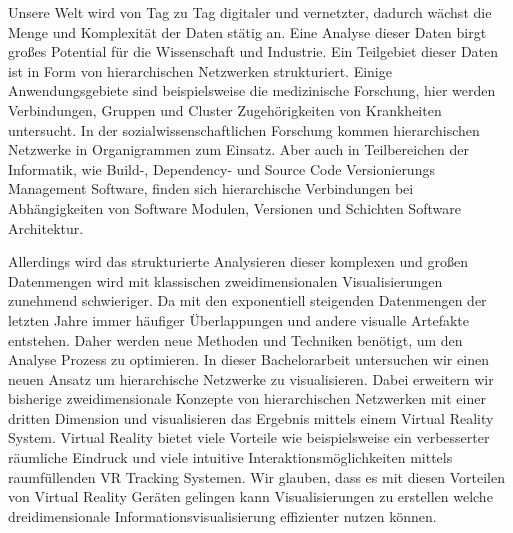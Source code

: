 Unsere Welt wird von Tag zu Tag digitaler und vernetzter, dadurch wächst die Menge und Komplexität der Daten stätig an.
Eine Analyse dieser Daten birgt großes Potential für die Wissenschaft und Industrie.
Ein Teilgebiet dieser Daten ist in Form von hierarchischen Netzwerken strukturiert. Einige Anwendungsgebiete sind beispielsweise die medizinische Forschung, hier werden Verbindungen, Gruppen und Cluster Zugehörigkeiten von Krankheiten untersucht. In der sozialwissenschaftlichen Forschung kommen hierarchischen Netzwerke in Organigrammen zum Einsatz. Aber auch in Teilbereichen der Informatik, wie Build-, Dependency- und Source Code Versionierungs Management Software, finden sich hierarchische Verbindungen bei Abhängigkeiten von Software Modulen, Versionen und Schichten Software Architektur. 

Allerdings wird das strukturierte Analysieren dieser komplexen und großen Datenmengen wird mit klassischen zweidimensionalen Visualisierungen zunehmend schwieriger.
Da mit den exponentiell steigenden Datenmengen der letzten Jahre immer häufiger Überlappungen und andere visualle Artefakte entstehen. 
Daher werden neue Methoden und Techniken benötigt, um den Analyse Prozess zu optimieren. In dieser Bachelorarbeit untersuchen wir einen neuen Ansatz um hierarchische Netzwerke zu visualisieren. Dabei erweitern wir bisherige zweidimensionale Konzepte von hierarchischen Netzwerken mit einer dritten Dimension und visualisieren das Ergebnis mittels einem Virtual Reality System. Virtual Reality bietet viele Vorteile wie beispielsweise ein verbesserter räumliche Eindruck und viele intuitive Interaktionsmöglichkeiten mittels raumfüllenden VR Tracking Systemen. 
Wir glauben, dass es mit diesen Vorteilen von Virtual Reality Geräten gelingen kann Visualisierungen zu erstellen welche dreidimensionale Informationsvisualisierung effizienter nutzen können.